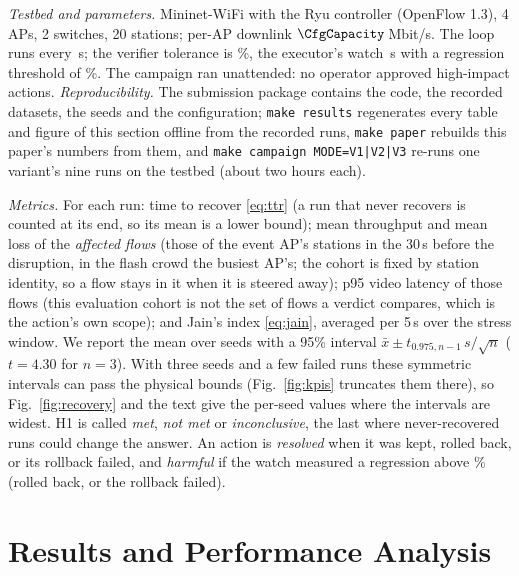 \documentclass[conference]{IEEEtran}
\begin{document}
\emph{Testbed and parameters.} Mininet-WiFi with the Ryu controller (OpenFlow 1.3), 4 APs, 2 switches, 20 stations; per-AP downlink $\CfgCapacity$\,Mbit/s. The loop runs every \CfgPeriod\,s; the verifier tolerance is \CfgChangePct\%, the executor's watch \CfgWatch\,s with a regression threshold of \CfgRegressPct\%. The campaign ran unattended: no operator approved high-impact actions. \emph{Reproducibility.} The submission package contains the code, the recorded datasets, the seeds and the configuration; \texttt{make results} regenerates every table and figure of this section offline from the recorded runs, \texttt{make paper} rebuilds this paper's numbers from them, and \texttt{make campaign MODE=V1|V2|V3} re-runs one variant's nine runs on the testbed (about two hours each).

\emph{Metrics.} For each run: time to recover \eqref{eq:ttr} (a run that never recovers is counted at its end, so its mean is a lower bound); mean throughput and mean loss of the \emph{affected flows} (those of the event AP's stations in the 30\,s before the disruption, in the flash crowd the busiest AP's; the cohort is fixed by station identity, so a flow stays in it when it is steered away); p95 video latency of those flows (this evaluation cohort is not the set of flows a verdict compares, which is the action's own scope); and Jain's index \eqref{eq:jain}, averaged per 5\,s over the stress window. We report the mean over seeds with a 95\% interval $\bar x\pm t_{0.975,n-1}\,s/\sqrt n$ ($t=4.30$ for $n=3$). With three seeds and a few failed runs these symmetric intervals can pass the physical bounds (Fig.~\ref{fig:kpis} truncates them there), so Fig.~\ref{fig:recovery} and the text give the per-seed values where the intervals are widest. H1 is called \emph{met}, \emph{not met} or \emph{inconclusive}, the last where never-recovered runs could change the answer. An action is \emph{resolved} when it was kept, rolled back, or its rollback failed, and \emph{harmful} if the watch measured a regression above \CfgRegressPct\% (rolled back, or the rollback failed).

\section{Results and Performance Analysis}
\begin{table}[t]
\caption{KPIs of the affected flows (mean $\pm$ 95\% Student-$t$ interval over three seeds; the intervals are wide and symmetric, so they can pass the physical bounds, which Fig.~\ref{fig:kpis} truncates). $\geq$ marks a recovery time that includes runs that never recovered (their number in brackets), counted at the run end.}
\label{tab:kpi}
\centering\small

\end{table}
\end{document}

